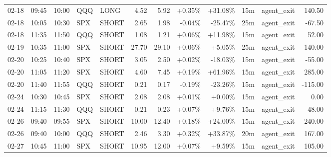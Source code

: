 \documentclass[11pt,a4paper]{article}
\begin{document}
\begin{center}
\begin{longtable}{>{\color{txtmain}}l l l l l r r r r r >{\color{txtmain}}l r}
02-18 & 09:45 & 10:00 & QQQ & LONG & 4.52 & 5.92 & \textcolor{wingreen}{+0.35\%} & \textcolor{wingreen}{+31.08\%} & 15m & agent\_exit & \textcolor{wingreen}{140.50} \\
02-18 & 10:05 & 10:30 & SPX & SHORT & 2.65 & 1.98 & \textcolor{lossred}{-0.04\%} & \textcolor{lossred}{-25.47\%} & 25m & agent\_exit & \textcolor{lossred}{-67.50} \\
02-18 & 11:35 & 11:50 & QQQ & SHORT & 1.08 & 1.21 & \textcolor{wingreen}{+0.06\%} & \textcolor{wingreen}{+11.98\%} & 15m & agent\_exit & \textcolor{wingreen}{52.00} \\
02-19 & 10:35 & 11:00 & SPX & SHORT & 27.70 & 29.10 & \textcolor{wingreen}{+0.06\%} & \textcolor{wingreen}{+5.05\%} & 25m & agent\_exit & \textcolor{wingreen}{140.00} \\
02-20 & 10:25 & 10:40 & SPX & SHORT & 3.05 & 2.50 & \textcolor{wingreen}{+0.02\%} & \textcolor{lossred}{-18.03\%} & 15m & agent\_exit & \textcolor{lossred}{-55.00} \\
02-20 & 11:05 & 11:20 & SPX & SHORT & 4.60 & 7.45 & \textcolor{wingreen}{+0.19\%} & \textcolor{wingreen}{+61.96\%} & 15m & agent\_exit & \textcolor{wingreen}{285.00} \\
02-20 & 11:40 & 11:55 & QQQ & SHORT & 0.21 & 0.17 & \textcolor{lossred}{-0.19\%} & \textcolor{lossred}{-23.26\%} & 15m & agent\_exit & \textcolor{lossred}{-115.00} \\
02-24 & 10:30 & 10:45 & SPX & SHORT & 2.08 & 2.08 & \textcolor{wingreen}{+0.01\%} & \textcolor{wingreen}{+0.00\%} & 15m & agent\_exit & \textcolor{wingreen}{0.00} \\
02-24 & 11:15 & 11:30 & QQQ & SHORT & 0.21 & 0.23 & \textcolor{wingreen}{+0.07\%} & \textcolor{wingreen}{+9.76\%} & 15m & agent\_exit & \textcolor{wingreen}{48.00} \\
02-26 & 09:40 & 09:55 & SPX & SHORT & 10.00 & 12.40 & \textcolor{wingreen}{+0.18\%} & \textcolor{wingreen}{+24.00\%} & 15m & agent\_exit & \textcolor{wingreen}{240.00} \\
02-26 & 09:40 & 10:00 & QQQ & SHORT & 2.46 & 3.30 & \textcolor{wingreen}{+0.32\%} & \textcolor{wingreen}{+33.87\%} & 20m & agent\_exit & \textcolor{wingreen}{167.00} \\
02-27 & 10:45 & 11:00 & SPX & SHORT & 10.95 & 12.00 & \textcolor{wingreen}{+0.07\%} & \textcolor{wingreen}{+9.59\%} & 15m & agent\_exit & \textcolor{wingreen}{105.00} \\
\end{longtable}
\end{center}
\clearpage
\end{document}
